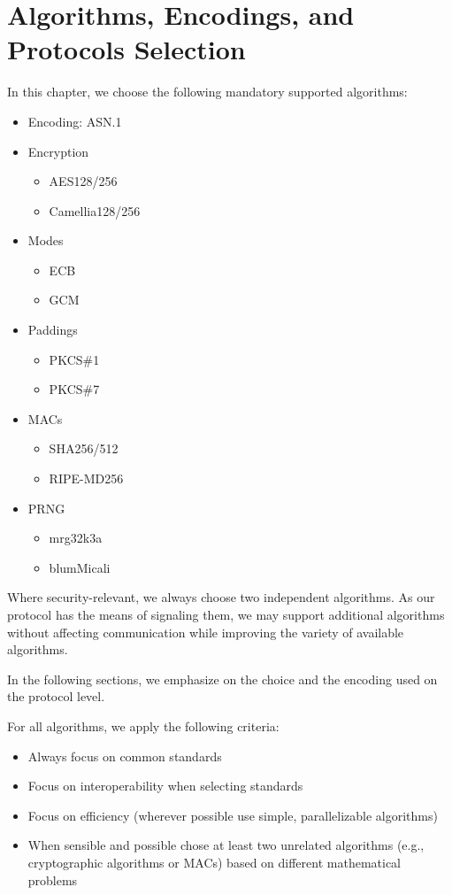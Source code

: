 \chapter{Algorithms, Encodings, and Protocols Selection}\label{sec:selection}
In this chapter, we choose the following mandatory supported algorithms:
\begin{itemize}
	\item Encoding: ASN.1
	\item Encryption
	\begin{itemize}
		\item AES128/256
		\item Camellia128/256
	\end{itemize}
	\item Modes
	\begin{itemize}
		\item ECB
		\item GCM
	\end{itemize}
	\item Paddings
	\begin{itemize}
		\item PKCS\#1
		\item PKCS\#7
	\end{itemize}
	\item MACs
	\begin{itemize}
		\item SHA256/512
		\item RIPE-MD256
	\end{itemize}
	\item PRNG
	\begin{itemize}
		\item mrg32k3a
		\item blumMicali
	\end{itemize}
\end{itemize}

Where security-relevant, we always choose two independent algorithms. As our protocol has the means of signaling them, we may support additional algorithms without affecting communication while improving the variety of available algorithms.

In the following sections, we emphasize on the choice and the encoding used on the protocol level.

For all algorithms, we apply the following criteria:
\begin{itemize}
	\item Always focus on common standards
	\item Focus on interoperability when selecting standards
	\item Focus on efficiency (wherever possible use simple, parallelizable algorithms)
	\item When sensible and possible chose at least two unrelated algorithms (e.g., cryptographic algorithms or MACs) based on different mathematical problems
\end{itemize}

